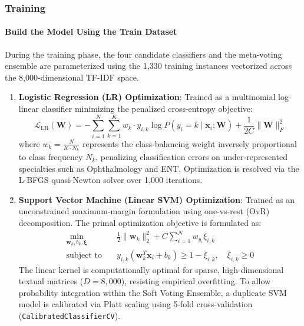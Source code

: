 \subsubsection{Training}

\paragraph{Build the Model Using the Train Dataset}
During the training phase, the four candidate classifiers and the meta-voting ensemble are parameterized using the 1,330 training instances vectorized across the 8,000-dimensional TF-IDF space.

\begin{enumerate}
    \item \textbf{Logistic Regression (LR) Optimization}:
    Trained as a multinomial log-linear classifier minimizing the penalized cross-entropy objective:
    \begin{equation}
        \mathcal{L}_{\text{LR}}(\mathbf{W}) = -\sum_{i=1}^{N} \sum_{k=1}^{K} w_k \cdot y_{i,k} \log P(y_i = k \mid \mathbf{x}_i; \mathbf{W}) + \frac{1}{2C} \|\mathbf{W}\|_F^2
    \end{equation}
    where $w_k = \frac{N}{K \cdot N_k}$ represents the class-balancing weight inversely proportional to class frequency $N_k$, penalizing classification errors on under-represented specialties such as Ophthalmology and ENT. Optimization is resolved via the L-BFGS quasi-Newton solver over 1,000 iterations.

    \item \textbf{Support Vector Machine (Linear SVM) Optimization}:
    Trained as an unconstrained maximum-margin formulation using one-vs-rest (OvR) decomposition. The primal optimization objective is formulated as:
    \begin{equation}
    \begin{aligned}
        \min_{\mathbf{w}_k, b_k, \boldsymbol{\xi}} \quad & \frac{1}{2} \|\mathbf{w}_k\|_2^2 + C \sum_{i=1}^{N} w_{y_i} \xi_{i,k} \\
        \text{subject to} \quad & y_{i,k}(\mathbf{w}_k^T \mathbf{x}_i + b_k) \ge 1 - \xi_{i,k}, \quad \xi_{i,k} \ge 0
    \end{aligned}
    \end{equation}
    The linear kernel is computationally optimal for sparse, high-dimensional textual matrices ($D = 8,000$), resisting empirical overfitting. To allow probability integration within the Soft Voting Ensemble, a duplicate SVM model is calibrated via Platt scaling using 5-fold cross-validation (\texttt{CalibratedClassifierCV}).


\end{enumerate}
